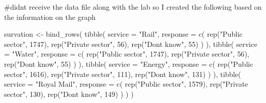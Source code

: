 \documentclass[
  letterpaper,
  DIV=11,
  numbers=noendperiod]{scrartcl}
\newenvironment{Shaded}{\begin{snugshade}}{\end{snugshade}}
\newcommand{\AttributeTok}[1]{\textcolor[rgb]{0.40,0.45,0.13}{#1}}
\newcommand{\CommentTok}[1]{\textcolor[rgb]{0.37,0.37,0.37}{#1}}
\newcommand{\DecValTok}[1]{\textcolor[rgb]{0.68,0.00,0.00}{#1}}
\newcommand{\FunctionTok}[1]{\textcolor[rgb]{0.28,0.35,0.67}{#1}}
\newcommand{\NormalTok}[1]{\textcolor[rgb]{0.00,0.23,0.31}{#1}}
\newcommand{\OtherTok}[1]{\textcolor[rgb]{0.00,0.23,0.31}{#1}}
\newcommand{\StringTok}[1]{\textcolor[rgb]{0.13,0.47,0.30}{#1}}
\begin{document}
\begin{Shaded}
\begin{Highlighting}[]
\CommentTok{\#didn\textquotesingle{}t receive the data file along with the lab so I created the following based on the information on the graph}

\NormalTok{survation }\OtherTok{\textless{}{-}} \FunctionTok{bind\_rows}\NormalTok{(}
  \FunctionTok{tibble}\NormalTok{(}
    \AttributeTok{service =} \StringTok{"Rail"}\NormalTok{,}
    \AttributeTok{response =} \FunctionTok{c}\NormalTok{(}
      \FunctionTok{rep}\NormalTok{(}\StringTok{"Public sector"}\NormalTok{, }\DecValTok{1747}\NormalTok{),}
      \FunctionTok{rep}\NormalTok{(}\StringTok{"Private sector"}\NormalTok{, }\DecValTok{56}\NormalTok{),}
      \FunctionTok{rep}\NormalTok{(}\StringTok{"Don\textquotesingle{}t know"}\NormalTok{, }\DecValTok{55}\NormalTok{)}
\NormalTok{    )}
\NormalTok{  ),}
  \FunctionTok{tibble}\NormalTok{(}
    \AttributeTok{service =} \StringTok{"Water"}\NormalTok{,}
    \AttributeTok{response =} \FunctionTok{c}\NormalTok{(}
      \FunctionTok{rep}\NormalTok{(}\StringTok{"Public sector"}\NormalTok{, }\DecValTok{1747}\NormalTok{),}
      \FunctionTok{rep}\NormalTok{(}\StringTok{"Private sector"}\NormalTok{, }\DecValTok{56}\NormalTok{),}
      \FunctionTok{rep}\NormalTok{(}\StringTok{"Don\textquotesingle{}t know"}\NormalTok{, }\DecValTok{55}\NormalTok{)}
\NormalTok{    )}
\NormalTok{  ),}
  \FunctionTok{tibble}\NormalTok{(}
    \AttributeTok{service =} \StringTok{"Energy"}\NormalTok{,}
    \AttributeTok{response =} \FunctionTok{c}\NormalTok{(}
      \FunctionTok{rep}\NormalTok{(}\StringTok{"Public sector"}\NormalTok{, }\DecValTok{1616}\NormalTok{),}
      \FunctionTok{rep}\NormalTok{(}\StringTok{"Private sector"}\NormalTok{, }\DecValTok{111}\NormalTok{),}
      \FunctionTok{rep}\NormalTok{(}\StringTok{"Don\textquotesingle{}t know"}\NormalTok{, }\DecValTok{131}\NormalTok{)}
\NormalTok{    )}
\NormalTok{  ),}
  \FunctionTok{tibble}\NormalTok{(}
    \AttributeTok{service =} \StringTok{"Royal Mail"}\NormalTok{,}
    \AttributeTok{response =} \FunctionTok{c}\NormalTok{(}
      \FunctionTok{rep}\NormalTok{(}\StringTok{"Public sector"}\NormalTok{, }\DecValTok{1579}\NormalTok{),}
      \FunctionTok{rep}\NormalTok{(}\StringTok{"Private sector"}\NormalTok{, }\DecValTok{130}\NormalTok{),}
      \FunctionTok{rep}\NormalTok{(}\StringTok{"Don\textquotesingle{}t know"}\NormalTok{, }\DecValTok{149}\NormalTok{)}
\NormalTok{    )}
\NormalTok{  )}
\NormalTok{)}


\end{Highlighting}
\end{Shaded}
\end{document}

